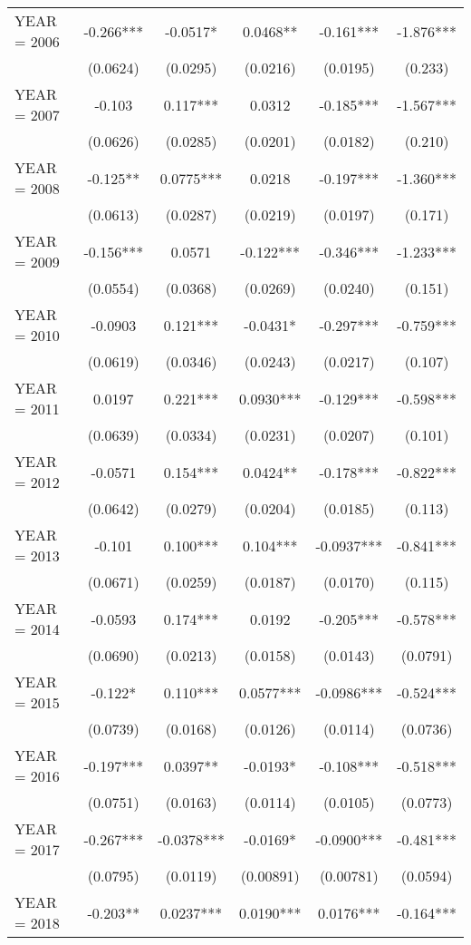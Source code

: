\begin{tabular}{lccccc}
YEAR = 2006 & -0.266*** & -0.0517* & 0.0468** & -0.161*** & -1.876*** \\
 & (0.0624) & (0.0295) & (0.0216) & (0.0195) & (0.233) \\
YEAR = 2007 & -0.103 & 0.117*** & 0.0312 & -0.185*** & -1.567*** \\
 & (0.0626) & (0.0285) & (0.0201) & (0.0182) & (0.210) \\
YEAR = 2008 & -0.125** & 0.0775*** & 0.0218 & -0.197*** & -1.360*** \\
 & (0.0613) & (0.0287) & (0.0219) & (0.0197) & (0.171) \\
YEAR = 2009 & -0.156*** & 0.0571 & -0.122*** & -0.346*** & -1.233*** \\
 & (0.0554) & (0.0368) & (0.0269) & (0.0240) & (0.151) \\
YEAR = 2010 & -0.0903 & 0.121*** & -0.0431* & -0.297*** & -0.759*** \\
 & (0.0619) & (0.0346) & (0.0243) & (0.0217) & (0.107) \\
YEAR = 2011 & 0.0197 & 0.221*** & 0.0930*** & -0.129*** & -0.598*** \\
 & (0.0639) & (0.0334) & (0.0231) & (0.0207) & (0.101) \\
YEAR = 2012 & -0.0571 & 0.154*** & 0.0424** & -0.178*** & -0.822*** \\
 & (0.0642) & (0.0279) & (0.0204) & (0.0185) & (0.113) \\
YEAR = 2013 & -0.101 & 0.100*** & 0.104*** & -0.0937*** & -0.841*** \\
 & (0.0671) & (0.0259) & (0.0187) & (0.0170) & (0.115) \\
YEAR = 2014 & -0.0593 & 0.174*** & 0.0192 & -0.205*** & -0.578*** \\
 & (0.0690) & (0.0213) & (0.0158) & (0.0143) & (0.0791) \\
YEAR = 2015 & -0.122* & 0.110*** & 0.0577*** & -0.0986*** & -0.524*** \\
 & (0.0739) & (0.0168) & (0.0126) & (0.0114) & (0.0736) \\
YEAR = 2016 & -0.197*** & 0.0397** & -0.0193* & -0.108*** & -0.518*** \\
 & (0.0751) & (0.0163) & (0.0114) & (0.0105) & (0.0773) \\
YEAR = 2017 & -0.267*** & -0.0378*** & -0.0169* & -0.0900*** & -0.481*** \\
 & (0.0795) & (0.0119) & (0.00891) & (0.00781) & (0.0594) \\
YEAR = 2018 & -0.203** & 0.0237*** & 0.0190*** & 0.0176*** & -0.164*** \\

\end{tabular}

